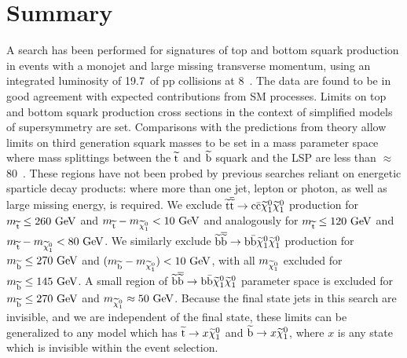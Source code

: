 \section{Summary}
A search has been performed for signatures of top and bottom squark production in events with a monojet and large missing transverse momentum, using an integrated luminosity of 19.7~\fbinv of pp collisions at 8~\TeV. 
The data are found to be in good agreement with expected contributions from \ac{SM} processes.  
Limits on top and bottom squark production cross sections in the context of simplified models of supersymmetry are set. 
Comparisons with the predictions from theory allow limits on third generation squark masses to be set in a mass parameter space where mass splittings between the $\widetilde{{\rm t}}$ and $\widetilde{{\rm b}}$ squark and the LSP are less than $\approx$ 80~\GeV.
These regions have not been probed by previous searches reliant on energetic sparticle decay products: where more than one jet, lepton or photon, as well as large missing energy, is required.  
We exclude $\widetilde{{\rm t}} \overline{\widetilde{\mathrm{t}}} \rightarrow \rm c \bar{\rm c} \widetilde{\chi}^{0}_{1} \widetilde{\chi}^{0}_{1}$ 
production for $m_{\widetilde{{\rm t}}} \leq 260~\mathrm{GeV}$ and
$m_{\widetilde{{\rm t}}} - m_{\widetilde{\chi}^{0}_{1}} <10~\mathrm{GeV}$ 
and analogously for $m_{\widetilde{{\rm t}}} \leq 120~\mathrm{GeV}$ and
$m_{\widetilde{{\rm t}}} - m_{\widetilde{\chi}^{0}_{1}} <80~\mathrm{GeV}$.
We similarly exclude $\widetilde{{\rm b}} \overline{\widetilde{\mathrm{b}}} \rightarrow \rm b \bar{\rm b} \widetilde{\chi}^{0}_{1} \widetilde{\chi}^{0}_{1}$ production for $m_{\widetilde{{\rm b}}} \leq 270~\mathrm{GeV}$ and 
$(m_{\widetilde{{\rm b}}} - m_{\widetilde{\chi}^{0}_{1}}) <10~\mathrm{GeV}$, with all $m_{\widetilde{\chi}^{0}_{1}}$ excluded for $m_{\widetilde{{\rm b}}} \leq 145~\mathrm{GeV}$.
A small region of $\widetilde{{\rm b}} \overline{\widetilde{\mathrm{b}}} \rightarrow \rm b \bar{\rm b} \widetilde{\chi}^{0}_{1} \widetilde{\chi}^{0}_{1}$ parameter space is excluded for $m_{\widetilde{{\rm b}}} \leq 270~\mathrm{GeV}$ and $m_{\widetilde{\chi}^{0}_{1}} \approx 50~\mathrm{GeV}$.
Because the final state jets in this search are invisible, and we are independent of the final state, these limits can be generalized to any model which has $\widetilde{{\rm t}} \rightarrow x \widetilde{\chi}^{0}_{1}$ and $\widetilde{{\rm b}} \rightarrow x \widetilde{\chi}^{0}_{1}$, where $x$ is any state which is invisible within the event selection.




